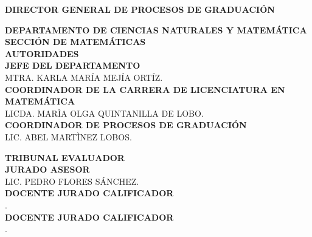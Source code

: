 \begin{center}
\begin{large}
		\textbf{DIRECTOR GENERAL DE PROCESOS DE GRADUACIÓN}\\
	\end{large}
	\newpage 
	\thispagestyle{empty}%
	\begin{large}
		\textbf{
			DEPARTAMENTO DE CIENCIAS NATURALES Y MATEMÁTICA\\
			\vspace{0.5in} 
			SECCIÓN DE MATEMÁTICAS\\
			\vspace{0.8in}
			AUTORIDADES\\
			\vspace{1.0in}	
		}
		\textbf{JEFE DEL DEPARTAMENTO}\\
		 MTRA. KARLA MARÍA MEJÍA ORTÍZ.\\
		\vspace{1.0in}
		\textbf{COORDINADOR DE LA CARRERA DE LICENCIATURA EN MATEMÁTICA}\\
		LICDA. MARÌA OLGA QUINTANILLA DE LOBO.\\
		\vspace{1.0in}
		\textbf{COORDINADOR DE PROCESOS DE GRADUACIÓN}\\
		LIC. ABEL MARTÌNEZ LOBOS.\\
	\end{large}
	\newpage
	\thispagestyle{empty}%
	\begin{large}
		\textbf{TRIBUNAL EVALUADOR}\\
		\vspace{1.5in}
		\textbf{JURADO ASESOR}\\
		LIC. PEDRO FLORES SÁNCHEZ.\\
		\vspace{2.0in}
		\textbf{DOCENTE JURADO CALIFICADOR}\\
		.\\
		\vspace{2.0in}
		\textbf{DOCENTE JURADO CALIFICADOR}\\
		.\\	
	\end{large}
\end{center}
